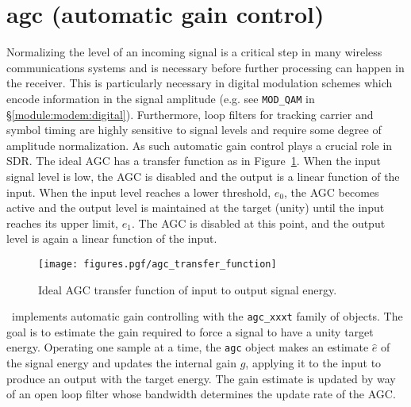% 
%

\newpage
\section{agc (automatic gain control)}
\label{module:agc}
Normalizing the level of an incoming signal is a critical step in
many wireless communications systems
and is necessary before further processing can happen in the receiver.
This is particularly necessary in digital
modulation schemes which encode information in the signal amplitude
(e.g. see {\tt MOD\_QAM} in \S\ref{module:modem:digital}).
Furthermore, loop filters for tracking carrier and symbol timing are highly
sensitive to signal levels and require some degree of amplitude
normalization.
As such automatic gain control plays a crucial role in SDR.
The ideal AGC has a transfer function as in
Figure~\ref{fig:module:agc:transfer_function}.
When the input signal level is low, the AGC is disabled and the output is a
linear function of the input.
When the input level reaches a lower threshold, $e_0$, the AGC becomes active
and the output level is maintained at the target (unity) until the input
reaches its upper limit, $e_1$.
The AGC is disabled at this point, and the output level is again a linear
function of the input.

\begin{figure}
\centering
  \texttt{[image: figures.pgf/agc\_transfer\_function]}
\caption{Ideal AGC transfer function of input to output signal energy.}
\label{fig:module:agc:transfer_function}
\end{figure}

\liquid\ implements automatic gain controlling with the {\tt agc\_xxxt}
family of objects.
The goal is to estimate the gain required to force a signal to have a
unity target energy.
Operating one sample at a time, the {\tt agc} object makes an estimate
$\hat{e}$ of the signal energy and updates the internal gain $g$,
applying it to the input to produce an output with the target energy.
The gain estimate is updated by way of an open loop filter whose bandwidth
determines the update rate of the AGC.

